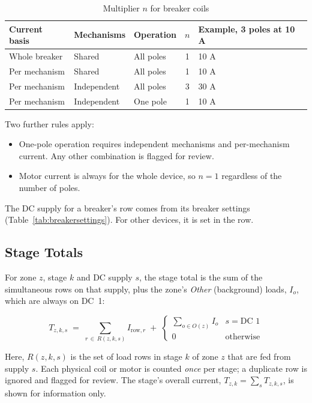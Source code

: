 \begin{table}[H]
  \centering
  \caption{Multiplier $n$ for breaker coils}
  \label{tab:multiplier}
  \begin{tabularx}{\textwidth}{l l l c L}
    \toprule
    \textbf{Current basis} & \textbf{Mechanisms} & \textbf{Operation} & $n$ & \textbf{Example, 3 poles at 10 A} \\
    \midrule
    Whole breaker & Shared & All poles & 1 & 10 A \\
    Per mechanism & Shared & All poles & 1 & 10 A \\
    Per mechanism & Independent & All poles & 3 & 30 A \\
    Per mechanism & Independent & One pole & 1 & 10 A \\
    \bottomrule
  \end{tabularx}
\end{table}

Two further rules apply:
\begin{itemize}
  \item One-pole operation requires independent mechanisms and per-mechanism current.
        Any other combination is flagged for review.
  \item Motor current is always for the whole device, so $n = 1$ regardless of the
        number of poles.
\end{itemize}
The DC supply for a breaker's row comes from its breaker settings
(Table~\ref{tab:breakersettings}). For other devices, it is set in the row.

\subsection{Stage Totals}

For zone $z$, stage $k$ and DC supply $s$, the stage total is the sum of the
simultaneous rows on that supply, plus the zone's \emph{Other} (background) loads,
$I_o$, which are always on DC~1:

\begin{equation}
  T_{z,k,s} \;=\; \sum_{r \,\in\, R(z,k,s)} I_{\text{row},r}
  \;+\; \begin{cases} \sum_{o \in O(z)} I_o & s = \text{DC 1}\\ 0 & \text{otherwise}\end{cases}
  \label{eq:stage}
\end{equation}

Here, $R(z,k,s)$ is the set of load rows in stage $k$ of zone $z$ that are fed from
supply $s$. Each physical coil or motor is counted \emph{once} per stage; a duplicate
row is ignored and flagged for review. The stage's overall current,
$T_{z,k} = \sum_s T_{z,k,s}$, is shown for information only.

